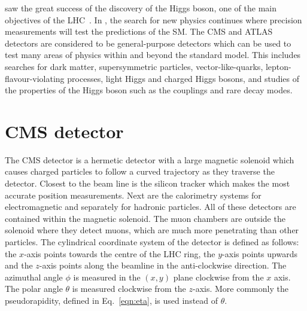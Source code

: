 \runone saw the great success of the discovery of the Higgs boson, one of the main objectives of the LHC~\cite{Aad20121,Chatrchyan201230}. In \runtwo, the search for new physics continues where precision measurements will test the predictions of the SM. The CMS and ATLAS detectors are considered to be general-purpose detectors which can be used to test many areas of physics within and beyond the standard model. This includes searches for dark matter, supersymmetric particles, vector-like-quarks, lepton-flavour-violating processes, light Higgs and charged Higgs bosons, and studies of the properties of the Higgs boson such as the couplings and rare decay modes.


\section{CMS detector \label{sec:CMSdet}}

The CMS detector is a hermetic detector with a large magnetic solenoid which causes charged particles to follow a curved trajectory as they traverse the detector. Closest to the beam line is the silicon tracker which makes the most accurate position measurements. Next are the calorimetry systems for electromagnetic and separately for hadronic particles. All of these detectors are contained within the magnetic solenoid. The muon chambers are outside the solenoid where they detect muons, which are much more penetrating than other particles. The cylindrical coordinate system of the detector is defined as follows: the $x$-axis points towards the centre of the LHC ring, the $y$-axis points upwards and the $z$-axis points along the beamline in the anti-clockwise direction. The azimuthal angle $\phi$ is measured in the $(x,y)$ plane clockwise from the $x$ axis. The polar angle $\theta$ is measured clockwise from the $z$-axis. More commonly the pseudorapidity, defined in Eq.~\ref{eqn:eta}, is used instead of $\theta$.

